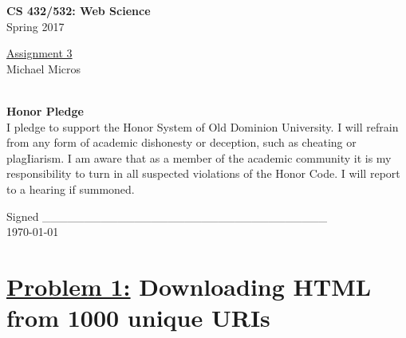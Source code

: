 \documentclass{article}
\begin{document}

\begin{titlepage}

\vspace*{45 pt}
\begin{center}
\Huge{\bf CS 432/532:  Web Science}\\
\huge{Spring 2017\\}

\vspace{60 pt}
\Huge\underline {Assignment 3}\\

\vspace{10 pt}
\Huge{Michael Micros}\\\

\vspace{200 pt}
{\huge \bf {Honor Pledge}}\\
\Large{I pledge to support the Honor System of Old Dominion University. I will refrain from any form of academic dishonesty or deception, such as cheating or plagIiarism. I am aware that as a member of the academic community it is my responsibility to turn in all suspected violations of the Honor Code. I will report to a hearing if summoned. }\\
\vspace {.5cm}

{Signed \_\_\_\_\_\_\_\_\_\_\_\_\_\_\_\_\_\_\_\_\_\_\_\_\_\_\_\_\_\_\_\_\_\_}\\
\today

\end{center}
\end{titlepage}





\section*{{\underline{\huge {Problem 1:}} Downloading HTML from 1000 unique URIs}}
\end{document}
